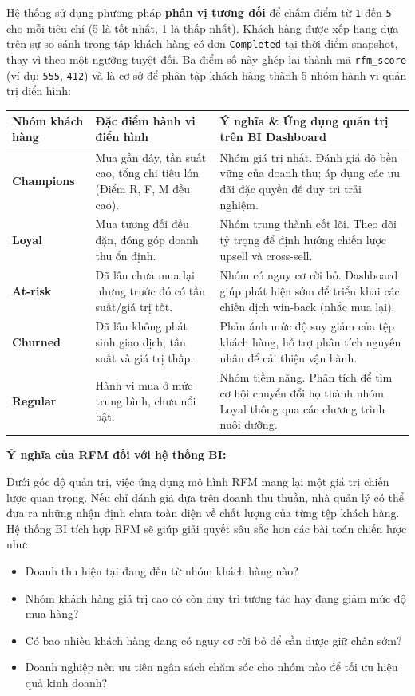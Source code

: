 \documentclass[12pt,a4paper]{article}
\newcommand{\code}[1]{\texttt{#1}}
\begin{document}
Hệ thống sử dụng phương pháp \textbf{phân vị tương đối} để chấm điểm từ \code{1} đến \code{5} cho mỗi tiêu chí (5 là tốt nhất, 1 là thấp nhất). Khách hàng được xếp hạng dựa trên sự so sánh trong tập khách hàng có đơn \code{Completed} tại thời điểm snapshot, thay vì theo một ngưỡng tuyệt đối. Ba điểm số này ghép lại thành mã \code{rfm\_score} (ví dụ: \code{555}, \code{412}) và là cơ sở để phân tập khách hàng thành 5 nhóm hành vi quản trị điển hình:

{\footnotesize
\begin{table}[H]
\centering
\begin{tabularx}{\textwidth}{|p{}|Y|Y|}
\hline
\textbf{Nhóm khách hàng} & \textbf{Đặc điểm hành vi điển hình} & \textbf{Ý nghĩa \& Ứng dụng quản trị trên BI Dashboard} \\
\hline
\textbf{Champions} & Mua gần đây, tần suất cao, tổng chi tiêu lớn (Điểm R, F, M đều cao). & Nhóm giá trị nhất. Đánh giá độ bền vững của doanh thu; áp dụng các ưu đãi đặc quyền để duy trì trải nghiệm. \\
\hline
\textbf{Loyal} & Mua tương đối đều đặn, đóng góp doanh thu ổn định. & Nhóm trung thành cốt lõi. Theo dõi tỷ trọng để định hướng chiến lược upsell và cross-sell. \\
\hline
\textbf{At-risk} & Đã lâu chưa mua lại nhưng trước đó có tần suất/giá trị tốt. & Nhóm có nguy cơ rời bỏ. Dashboard giúp phát hiện sớm để triển khai các chiến dịch win-back (nhắc mua lại). \\
\hline
\textbf{Churned} & Đã lâu không phát sinh giao dịch, tần suất và giá trị thấp. & Phản ánh mức độ suy giảm của tệp khách hàng, hỗ trợ phân tích nguyên nhân để cải thiện vận hành. \\
\hline
\textbf{Regular} & Hành vi mua ở mức trung bình, chưa nổi bật. & Nhóm tiềm năng. Phân tích để tìm cơ hội chuyển đổi họ thành nhóm Loyal thông qua các chương trình nuôi dưỡng. \\
\hline
\end{tabularx}
\end{table}
}

\textbf{Ý nghĩa của RFM đối với hệ thống BI:}

Dưới góc độ quản trị, việc ứng dụng mô hình RFM mang lại một giá trị chiến lược quan trọng. Nếu chỉ đánh giá dựa trên doanh thu thuần, nhà quản lý có thể đưa ra những nhận định chưa toàn diện về chất lượng của từng tệp khách hàng. Hệ thống BI tích hợp RFM sẽ giúp giải quyết sâu sắc hơn các bài toán chiến lược như:

\begin{itemize}
    \item Doanh thu hiện tại đang đến từ nhóm khách hàng nào?
    \item Nhóm khách hàng giá trị cao có còn duy trì tương tác hay đang giảm mức độ mua hàng?
    \item Có bao nhiêu khách hàng đang có nguy cơ rời bỏ để cần được giữ chân sớm?
    \item Doanh nghiệp nên ưu tiên ngân sách chăm sóc cho nhóm nào để tối ưu hiệu quả kinh doanh?
\end{itemize}
\end{document}
